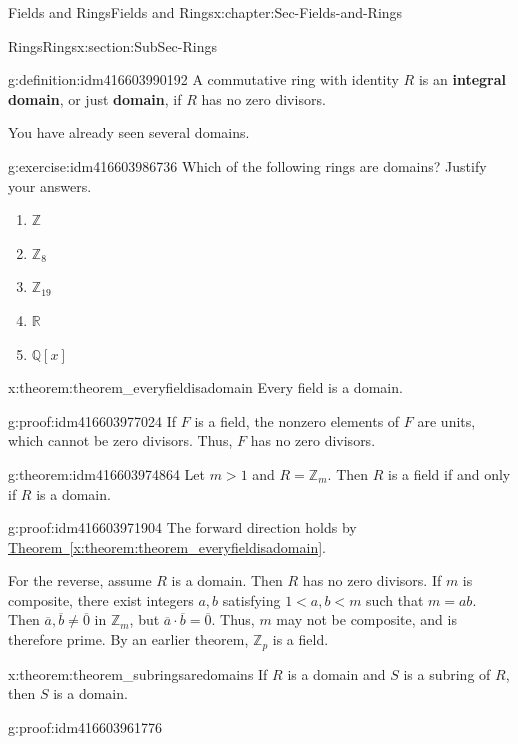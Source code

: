 \documentclass[oneside,10pt,]{book}
\newcommand{\terminology}[1]{\textbf{#1}}
\numberwithin{equation}{section}
\def\Z{{\mathbb Z}}
\def\Q{{\mathbb Q}}
\def\R{{\mathbb R}}
\newcommand{\lt}{<}
\begin{document}
\begin{chapterptx}{Fields and Rings}{}{Fields and Rings}{}{}{x:chapter:Sec-Fields-and-Rings}
\begin{sectionptx}{Rings}{}{Rings}{}{}{x:section:SubSec-Rings}
\begin{definition}{}{g:definition:idm416603990192}%
A commutative ring with identity \(R\) is an \terminology{integral domain}, or just \terminology{domain}, if \(R\) has no zero divisors.%
\end{definition}
You have already seen several domains.%
\begin{inlineexercise}{}{g:exercise:idm416603986736}%
Which of the following rings are domains? Justify your answers.%
\begin{enumerate}
\item{}\(\Z\)%
\item{}\(\Z_{8}\)%
\item{}\(\Z_{19}\)%
\item{}\(\R\)%
\item{}\(\Q[x]\)%
\end{enumerate}
%
\end{inlineexercise}
\begin{theorem}{}{}{x:theorem:theorem_everyfieldisadomain}%
Every field is a domain.%
\end{theorem}
\begin{proofptx}{}{g:proof:idm416603977024}
If \(F\) is a field, the nonzero elements of \(F\) are units, which cannot be zero divisors. Thus, \(F\) has no zero divisors.%
\end{proofptx}
\begin{theorem}{}{}{g:theorem:idm416603974864}%
Let \(m > 1\) and \(R = \Z_m\). Then \(R\) is a field if and only if \(R\) is a domain.%
\end{theorem}
\begin{proofptx}{}{g:proof:idm416603971904}
The forward direction holds by \hyperref[x:theorem:theorem_everyfieldisadomain]{Theorem~\ref{x:theorem:theorem_everyfieldisadomain}}.%
\par
For the reverse, assume \(R\) is a domain. Then \(R\) has no zero divisors. If \(m\) is composite, there exist integers \(a,b\) satisfying \(1 \lt a,b \lt m\) such that \(m=ab\). Then \(\overline{a},\overline{b}\ne \overline{0}\) in \(\Z_m\), but \(\overline{a}\cdot \overline{b} = \overline{0}\). Thus, \(m\) may not be composite, and is therefore prime. By an earlier theorem, \(\Z_p\) is a field.%
\end{proofptx}
\begin{theorem}{}{}{x:theorem:theorem_subringsaredomains}%
If \(R\) is a domain and \(S\) is a subring of \(R\), then \(S\) is a domain.%
\end{theorem}
\begin{proofptx}{}{g:proof:idm416603961776}

\end{proofptx}
\end{sectionptx}
\end{chapterptx}
\end{document}
